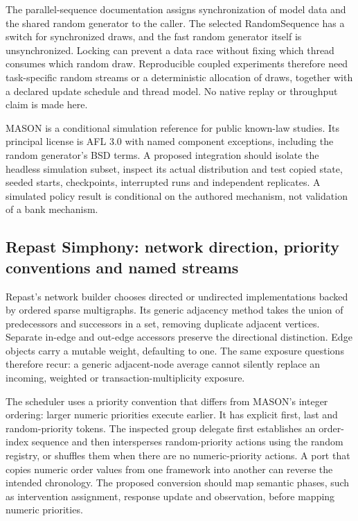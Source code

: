 The parallel-sequence documentation assigns synchronization of model data and the shared random generator to the caller. The selected RandomSequence has a switch for synchronized draws, and the fast random generator itself is unsynchronized. Locking can prevent a data race without fixing which thread consumes which random draw. Reproducible coupled experiments therefore need task-specific random streams or a deterministic allocation of draws, together with a declared update schedule and thread model. No native replay or throughput claim is made here.~\citep{exec25_jnet_mason}

MASON is a conditional simulation reference for public known-law studies. Its principal license is AFL 3.0 with named component exceptions, including the random generator's BSD terms. A proposed integration should isolate the headless simulation subset, inspect its actual distribution and test copied state, seeded starts, checkpoints, interrupted runs and independent replicates. A simulated policy result is conditional on the authored mechanism, not validation of a bank mechanism.~\citep{exec25_jnet_mason,exec25_jnet_choice}

\subsection{Repast Simphony: network direction, priority conventions and named streams}

Repast's network builder chooses directed or undirected implementations backed by ordered sparse multigraphs. Its generic adjacency method takes the union of predecessors and successors in a set, removing duplicate adjacent vertices. Separate in-edge and out-edge accessors preserve the directional distinction. Edge objects carry a mutable weight, defaulting to one. The same exposure questions therefore recur: a generic adjacent-node average cannot silently replace an incoming, weighted or transaction-multiplicity exposure.~\citep{exec25_jnet_repast}

The scheduler uses a priority convention that differs from MASON's integer ordering: larger numeric priorities execute earlier. It has explicit first, last and random-priority tokens. The inspected group delegate first establishes an order-index sequence and then intersperses random-priority actions using the random registry, or shuffles them when there are no numeric-priority actions. A port that copies numeric order values from one framework into another can reverse the intended chronology. The proposed conversion should map semantic phases, such as intervention assignment, response update and observation, before mapping numeric priorities.~\citep{exec25_jnet_repast}

